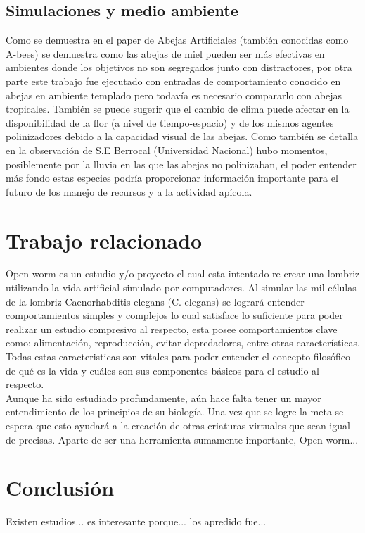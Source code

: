 \documentclass[conference]{IEEEtran}
\begin{document}
\subsection{Simulaciones y medio ambiente}
Como se demuestra en el paper de Abejas Artificiales (tambi\'en conocidas como A-bees) se demuestra como las abejas de miel pueden ser m\'as efectivas en ambientes donde los objetivos no son segregados junto con distractores, por otra parte este trabajo fue ejecutado con entradas de comportamiento conocido en abejas en ambiente templado pero todav\'ia es necesario compararlo con abejas tropicales.
Tambi\'en se puede sugerir que el cambio de clima puede afectar en la disponibilidad de la flor (a nivel de tiempo-espacio) y de los mismos agentes polinizadores debido a la capacidad visual de las abejas. Como tambi\'en se detalla en la observaci\'on de S.E Berrocal (Universidad Nacional) hubo momentos, posiblemente por la lluvia en las que las abejas no polinizaban, el poder entender m\'as fondo estas especies podr\'ia proporcionar informaci\'on importante para el futuro de los manejo de recursos y a la actividad ap\'icola. 


\section{Trabajo relacionado}

Open worm es un estudio y/o proyecto el cual esta intentado re-crear una lombriz utilizando la vida artificial simulado por computadores.  Al simular las mil c\'elulas de la lombriz Caenorhabditis elegans (C. elegans) se lograr\'a entender comportamientos simples y complejos lo cual satisface lo suficiente para poder realizar un estudio compresivo al respecto, esta posee comportamientos clave como: alimentaci\'on, reproducci\'on, evitar depredadores, entre otras caracter\'isticas. \cite{openworm} Todas estas caracteristicas son vitales para poder entender el concepto filos\'ofico de qu\'e es la vida y cu\'ales son sus componentes b\'asicos para el estudio al respecto. \\
Aunque ha sido estudiado profundamente, a\'un hace falta tener un mayor entendimiento de los principios de su biolog\'ia.
Una vez que se logre la meta se espera que esto ayudar\'a a la creaci\'on de otras criaturas virtuales que sean igual de precisas.
Aparte de ser una herramienta sumamente importante, Open worm... %

\section{Conclusi\'on}

Existen estudios... es interesante porque... los apredido fue...

\nocite{*}


\end{document}
